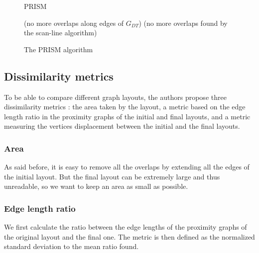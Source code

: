 \documentclass[12pt]{report}
\begin{document}
\begin{figure}
\begin{algorithm}[H]
\caption{PRISM}
	 
(no more overlaps along edges of $G_{DT}$)
\BlankLine
{}	
(no more overlaps found by the scan-line algorithm)
\end{algorithm}
\caption{The PRISM algorithm}
\end{figure}

\subsection{Dissimilarity metrics}

To be able to compare different graph layouts, the authors propose three dissimilarity metrics : the area taken by the layout, a metric based on the edge length ratio in the proximity graphs of the initial and final layouts, and a metric measuring the vertices displacement between the initial and the final layouts.

\subsubsection{Area}
As said before, it is easy to remove all the overlaps by extending all the edges of the initial layout. But the final layout can be extremely large and thus unreadable, so we want to keep an area as small as possible.

\subsubsection{Edge length ratio}
We first calculate the ratio between the edge lengths of the proximity graphs of the original layout and the final one. The metric is then defined as the normalized standard deviation to the mean ratio found.
\end{document}
